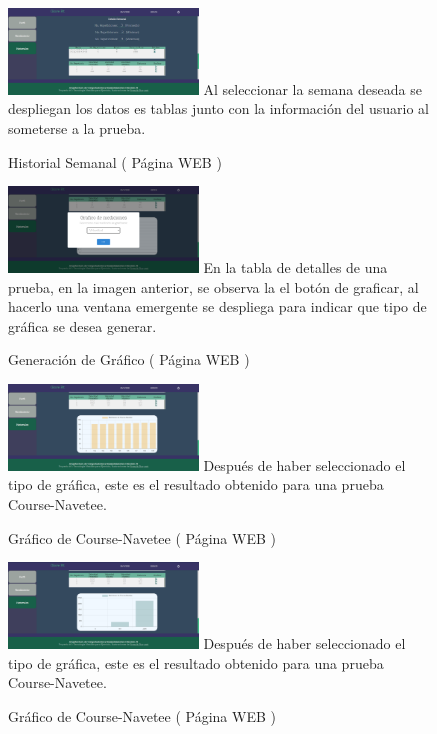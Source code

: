 \documentclass[osajnl,twocolumn,showpacs,superscriptaddress,10pt]{revtex4-1}
\begin{document}
\begin{figure} [H] \centering 
\caption{Historial Semanal
 ( Página WEB )}
\includegraphics[width=0.45\textwidth]{05history-user.png}
 \newline Al seleccionar la semana deseada se despliegan los datos es tablas junto con la información del usuario al someterse a la prueba.
\end{figure}

\begin{figure} [H] \centering 
\caption{Generación de Gráfico
 ( Página WEB )}
\includegraphics[width=0.45\textwidth]{06grafico.png}
\newline En la tabla de detalles de una prueba, en la imagen anterior, se observa la el botón de graficar, al hacerlo una ventana emergente se despliega para indicar que tipo de gráfica se desea generar. 
\end{figure}

\begin{figure} [H] \centering 
\caption{Gráfico de Course-Navetee
 ( Página WEB )}
\includegraphics[width=0.45\textwidth]{07grafico-show.png}
Después de haber seleccionado el tipo de gráfica, este es el resultado obtenido para una prueba Course-Navetee.
\end{figure}

\begin{figure} [H] \centering 
\caption{Gráfico de Course-Navetee
 ( Página WEB )}
\includegraphics[width=0.45\textwidth]{08graficos-show1.png}
Después de haber seleccionado el tipo de gráfica, este es el resultado obtenido para una prueba Course-Navetee.
\end{figure}
\end{document}
